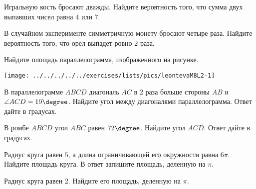 \begin{homework}[number=1]
	\begin{listofex}
		\item Игральную кость бросают дважды. Найдите вероятность того, что сумма двух выпавших чисел равна \( 4 \) или \( 7 \).
		\item В случайном эксперименте симметричную монету бросают четыре раза. Найдите вероятность того, что орел выпадет ровно \( 2 \) раза.
		\item 
		\begin{minipage}[t]{\bodywidth}
			Найдите площадь параллелограмма, изображенного на рисунке.
		\end{minipage}
		\hspace{0.02\linewidth}
		\begin{minipage}[t]{\picwidth}
			\texttt{[image: ../../../../../exercises/lists/pics/leontevaM8L2-1]}
		\end{minipage}
		\item В параллелограмме \( ABCD \) диагональ \( AC \) в \( 2 \) раза больше стороны \( AB \) и \( \angle ACD=19\degree \). Найдите угол между диагоналями параллелограмма. Ответ дайте в градусах.
		\item В ромбе \( ABCD \) угол \( ABC \) равен \( 72\degree \). Найдите угол \( ACD \). Ответ дайте в градусах.
		\item Радиус круга равен \( 5 \), а длина ограничивающей его окружности равна \( 6\pi \). Найдите площадь круга. В ответ запишите площадь, деленную на \( \pi \).
		\item Радиус круга равен \( 2 \). Найдите его площадь, деленную на \( \pi \).
	\end{listofex}
\end{homework}

